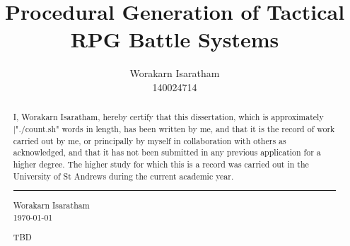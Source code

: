 \documentclass[a4paper,12pt]{report}
\title{Procedural Generation of Tactical RPG Battle Systems}
\author{Worakarn Isaratham\\140024714}
\begin{document}



\makeatletter
\patchcmd{\titlepage}{\setcounter{page}\@ne}{}{}{}
\patchcmd{\endtitlepage}{\setcounter{page}\@ne}{}{}{}

\patchcmd{\abstract}{\titlepage}{\titlepage\thispagestyle{plain}}{}{}
\makeatother

\newcommand{\gameref}[1]{\emph{\gls{#1}}}

\pagestyle{plain}

\renewcommand{\titlepage}{\relax}

\renewcommand{\abstractname}{Declaration}
\begin{abstract}
	
	I, Worakarn Isaratham, hereby certify that this dissertation, which is approximately |"./count.sh" words in length, has been written by me, and that it is the record of work carried out by me, or principally by myself in collaboration with others as acknowledged, and that it has not been submitted in any previous application for a higher degree. The higher study for which this is a record was carried out in the University of St Andrews during the current academic year.\\[2cm]
	
	\begin{flushright}
		\rule{0.3\textwidth}{0.4pt}
		
		Worakarn Isaratham\\
		\today
	\end{flushright}
\end{abstract}

\renewcommand{\abstractname}{Acknowledgements}
\begin{abstract}
	
TBD
	
\end{abstract}
\end{document}
